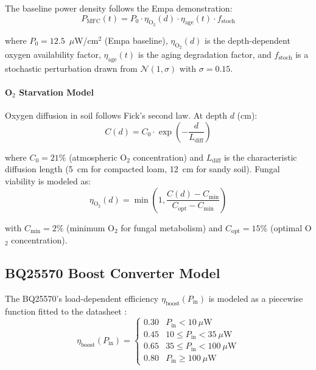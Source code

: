 \documentclass[twocolumn,10pt,a4paper]{article}
\begin{document}
The baseline power density follows the Empa demonstration:
\begin{equation}
P_{\text{MFC}}(t) = P_0 \cdot \eta_{\text{O}_2}(d) \cdot \eta_{\text{age}}(t) \cdot f_{\text{stoch}}
\label{eq:power}
\end{equation}

where $P_0 = 12.5$~$\mu$W/cm$^2$ (Empa baseline), $\eta_{\text{O}_2}(d)$ is the
depth-dependent oxygen availability factor, $\eta_{\text{age}}(t)$ is the
aging degradation factor, and $f_{\text{stoch}}$ is a stochastic perturbation
drawn from $\mathcal{N}(1, \sigma)$ with $\sigma = 0.15$.

\paragraph{O$_2$ Starvation Model}

Oxygen diffusion in soil follows Fick's second law. At depth $d$ (cm):
\begin{equation}
C(d) = C_0 \cdot \exp\left(-\frac{d}{L_{\text{diff}}}\right)
\label{eq:o2}
\end{equation}

where $C_0 = 21\%$ (atmospheric O$_2$ concentration) and
$L_{\text{diff}}$ is the characteristic diffusion length (5~cm for compacted
loam, 12~cm for sandy soil). Fungal viability is modeled as:
\begin{equation}
\eta_{\text{O}_2}(d) = \min\left(1, \frac{C(d) - C_{\text{min}}}{C_{\text{opt}} - C_{\text{min}}}\right)
\label{eq:viability}
\end{equation}

with $C_{\text{min}} = 2\%$ (minimum O$_2$ for fungal metabolism) and
$C_{\text{opt}} = 15\%$ (optimal O$_2$ concentration).

\subsection{BQ25570 Boost Converter Model}

The BQ25570's load-dependent efficiency $\eta_{\text{boost}}(P_{\text{in}})$
is modeled as a piecewise function fitted to the datasheet
\cite{bq25570}:
\begin{equation}
\eta_{\text{boost}}(P_{\text{in}}) =
\begin{cases}
0.30 & P_{\text{in}} < 10~\mu\text{W} \\
0.45 & 10 \leq P_{\text{in}} < 35~\mu\text{W} \\
0.65 & 35 \leq P_{\text{in}} < 100~\mu\text{W} \\
0.80 & P_{\text{in}} \geq 100~\mu\text{W}
\end{cases}
\label{eq:eff}
\end{equation}
\end{document}
